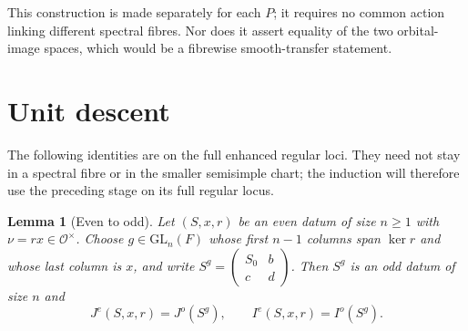 \documentclass[11pt,oneside,notitlepage]{book}
\numberwithin{equation}{section}
\theoremstyle{plain}
\newtheorem{lemma}[theorem]{Lemma}
\theoremstyle{definition}
\newcommand{\cO}{\mathcal{O}}
\newcommand{\GL}{\mathrm{GL}}
\begin{document}
This construction is made separately for each $P$; it requires no common action linking different spectral fibres. Nor does it assert equality of the two orbital-image spaces, which would be a fibrewise smooth-transfer statement.

\section{Unit descent}\label{sec:descent}

The following identities are on the full enhanced regular loci. They need not stay in a spectral fibre or in the smaller semisimple chart; the induction will therefore use the preceding stage on its full regular locus.

\begin{lemma}[Even to odd]\label{lem:even-odd}
Let $(S,x,r)$ be an even datum of size $n\ge1$ with $\nu=rx\in\cO^\times$. Choose $g\in\GL_n(F)$ whose first $n-1$ columns span $\ker r$ and whose last column is $x$, and write $S^g=\left(\begin{smallmatrix}S_0&b\\c&d\end{smallmatrix}\right)$. Then $S^g$ is an odd datum of size $n$ and
\[J^e(S,x,r)=J^o(S^g),\qquad I^e(S,x,r)=I^o(S^g).\]
\end{lemma}
\end{document}
